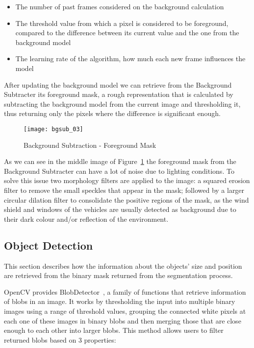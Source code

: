 \begin{itemize}
	\item The number of past frames considered on the background calculation
	\item The threshold value from which a pixel is considered to be foreground, compared to the difference between its current value and the one from the background model
	\item The learning rate of the algorithm, how much each new frame influences the model
\end{itemize}

After updating the background model we can retrieve from the Background Subtracter its foreground mask, a rough representation that is calculated by subtracting the background model from the current image and thresholding it, thus returning only the pixels where the difference is significant enough.

\begin{figure}[h]
  \begin{center}
    \leavevmode
    \texttt{[image: bgsub\_03]}
    \caption{Background Subtraction - Foreground Mask}
    \label{fig:bgsub_02}
  \end{center}
\end{figure}

As we can see in the middle image of Figure~\ref{fig:bgsub_02} the foreground mask from the Background Subtracter can have a lot of noise due to lighting conditions. To solve this issue two morphology filters are applied to the image: a squared erosion filter to remove the small speckles that appear in the mask; followed by a larger circular dilation filter to consolidate the positive regions of the mask, as the wind shield and windows of the vehicles are usually detected as background due to their dark colour and/or reflection of the environment.

\subsection{Object Detection}

This section describes how the information about the objects' size and position are retrieved from the binary mask returned from the segmentation process. 

OpenCV provides BlobDetector~\cite{opencv_opencv:_2017},  a family of functions that retrieve information of blobs in an image. It works by thresholding the input into multiple binary images using a range of threshold values, grouping the connected white pixels at each one of these images in binary blobs and then merging those that are close enough to each other into larger blobs. This method allows users to filter returned blobs based on 3 properties:

